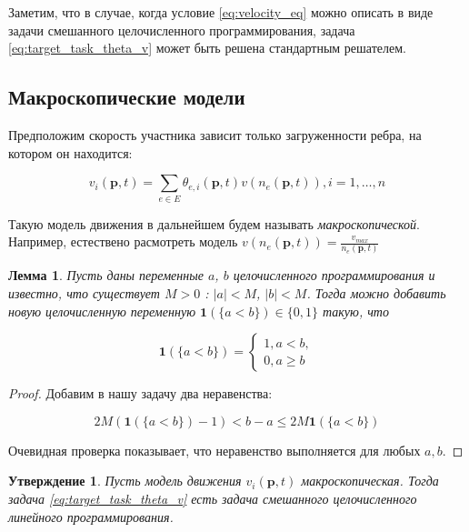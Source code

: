 \documentclass[12pt, a4paper]{article}
\newtheorem{state}{Утверждение}[section]
\newtheorem{lemma}{Лемма}[section]
\begin{document}
Заметим, что в случае, когда условие \eqref{eq:velocity_eq} можно описать в виде задачи смешанного целочисленного программирования, 
задача \eqref{eq:target_task_theta_v} может быть решена стандартным решателем.

\subsection*{Макроскопические модели}

Предположим скорость участника зависит только загруженности ребра, на котором он находится:

\begin{equation}
	\label{eq:velocity_eq_macro}
	 v_i(\textbf{p}, t) = \sum \limits _{e \in E} \theta_{e, i} (\textbf{p}, t) v (n_e (\textbf{p}, t)),  i = 1, \dots, n
\end{equation}

Такую модель движения в дальнейшем будем называть \textit{макроскопической}.
Например, естествено расмотреть модель $ v (n_e (\textbf{p}, t)) = \frac{v_{max}}{n_e (\textbf{p}, t)}$

\begin{lemma}
	\label{lemma:lt}
	Пусть даны переменные $a$, $b$ целочисленного программирования и известно, что существует $M > 0$ : $|a| < M$, $|b| < M$. Тогда можно добавить новую целочисленную переменную $\textbf{1} (\{a < b\}) \in \{0, 1\}$ такую, что
	
	\begin{equation*}
		\textbf{1} (\{a < b\}) = 
		\begin{cases}
			1, a < b,
			\\
			0, a \ge b
		\end{cases}
	\end{equation*}

\end{lemma}

\begin{proof}
	Добавим в нашу задачу два неравенства:
	
	$$ 2M (\textbf{1} (\{a < b\}) - 1) < b - a \le 2M\textbf{1} (\{a < b\}) $$
	
	Очевидная проверка показывает, что неравенство выполняется для любых $a, b$.
	
	
\end{proof}

\begin{state}
	Пусть модель движения $ v_i(\textbf{p}, t)$ макроскопическая. Тогда задача \eqref{eq:target_task_theta_v} есть задача смешанного целочисленного линейного программирования.
\end{state}
\end{document}
